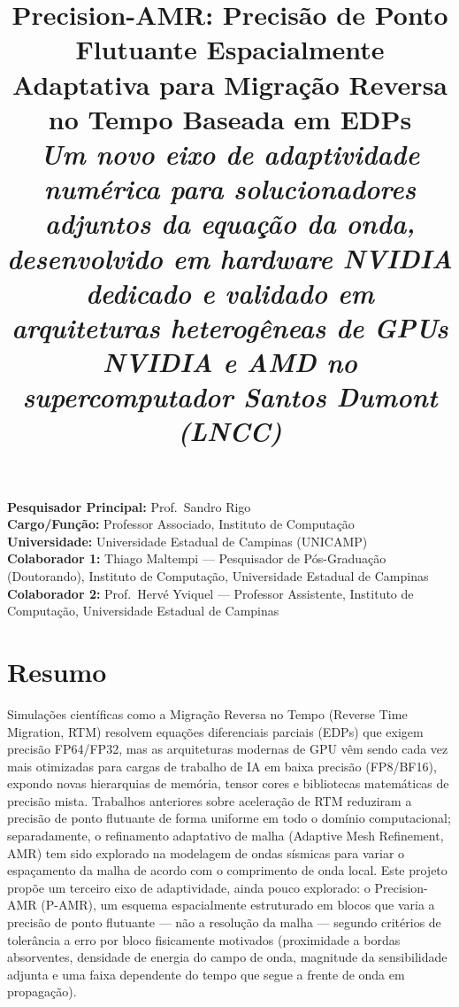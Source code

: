 \documentclass[12pt,a4paper]{article}
\title{\textbf{Precision-AMR: Precisão de Ponto Flutuante Espacialmente
Adaptativa para Migração Reversa no Tempo Baseada em EDPs}\\[0.5em]
\large\normalfont\itshape Um novo eixo de adaptividade numérica para
solucionadores adjuntos da equação da onda, desenvolvido em hardware NVIDIA
dedicado e validado em arquiteturas heterogêneas de GPUs NVIDIA e AMD no
supercomputador Santos Dumont (LNCC)}
\author{}
\date{}
\newcommand{\pamr}{P\nobreakdash-AMR}
\begin{document}
\maketitle
\thispagestyle{empty}

\begin{flushleft}
\textbf{Pesquisador Principal:} Prof.\ Sandro Rigo\\
\textbf{Cargo/Função:} Professor Associado, Instituto de Computação\\
\textbf{Universidade:} Universidade Estadual de Campinas (UNICAMP)\\[0.4em]
\textbf{Colaborador 1:} Thiago Maltempi --- Pesquisador de Pós-Graduação
(Doutorando), Instituto de Computação, Universidade Estadual de Campinas\\
\textbf{Colaborador 2:} Prof.\ Hervé Yviquel --- Professor Assistente,
Instituto de Computação, Universidade Estadual de Campinas
\end{flushleft}

\section*{Resumo}

Simulações científicas como a Migração Reversa no Tempo (Reverse Time
Migration, RTM) resolvem equações diferenciais parciais (EDPs) que exigem
precisão FP64/FP32, mas as arquiteturas modernas de GPU vêm sendo cada vez mais
otimizadas para cargas de trabalho de IA em baixa precisão (FP8/BF16),
expondo novas hierarquias de memória, tensor cores e bibliotecas matemáticas de
precisão mista. Trabalhos anteriores sobre aceleração de RTM reduziram a
precisão de ponto flutuante de forma uniforme em todo o domínio computacional;
separadamente, o refinamento adaptativo de malha (Adaptive Mesh Refinement,
AMR) tem sido explorado na modelagem de ondas sísmicas para variar o
espaçamento da malha de acordo com o comprimento de onda local. Este projeto
propõe um terceiro eixo de adaptividade, ainda pouco explorado: o
Precision-AMR (\pamr{}), um esquema espacialmente estruturado em blocos que
varia a precisão de ponto flutuante --- não a resolução da malha --- segundo
critérios de tolerância a erro por bloco fisicamente motivados (proximidade a
bordas absorventes, densidade de energia do campo de onda, magnitude da
sensibilidade adjunta e uma faixa dependente do tempo que segue a frente de
onda em propagação).
\end{document}
